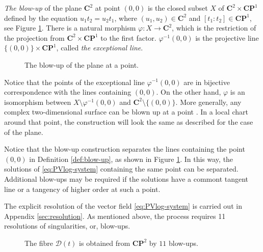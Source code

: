 \begin{definition}\label{def:blow-up}
\emph{The blow-up} of the plane $\mathbf{C}^2$ at point $(0,0)$ is the closed subset $X$ of $\mathbf{C}^2\times\mathbf{CP}^1$ defined by the equation $u_1t_2=u_2t_1$, where $(u_1,u_2)\in\mathbf{C}^2$ and $[t_1:t_2]\in\mathbf{CP}^1$, see Figure \ref{fig:blow-up}.
There is a natural morphism $\varphi: X\to\mathbf{C}^2$, which is the restriction of the projection from $\mathbf{C}^2\times\mathbf{CP}^1$ to the first factor.
$\varphi^{-1}(0,0)$ is the projective line $\{(0,0)\}\times\mathbf{CP}^1$, called \emph{the exceptional line}.
\end{definition}
\begin{figure}[h]
\centering

\caption{The blow-up of the plane at a point.}\label{fig:blow-up}
\end{figure}

\begin{remark}
Notice that the points of the exceptional line $\varphi^{-1}(0,0)$ are in bijective correspondence with the lines containing $(0,0)$.
On the other hand,
$\varphi$ is an isomorphism between $X\setminus\varphi^{-1}(0,0)$ and $\mathbf{C}^2\setminus\{(0,0)\}$.
More generally, any complex two-dimensional surface can be blown up at a point \cite{HartshorneAG,GrifHarPRINC,DuistermaatBOOK}.
In a local chart around that point, the construction will look the same as described for the case of the plane.
\end{remark}

Notice that the blow-up construction separates the lines containing the point $(0,0)$ in Definition \ref{def:blow-up}, as shown in Figure \ref{fig:blow-up}.
In this way, the solutions of \eqref{eq:PVlog-system} containing the same point can be separated.
Additional blow-ups may be required if the solutions have a commont tangent line or a tangency of higher order at such a point.

The explicit resolution of the vector field \eqref{eq:PVlog-system} is carried out in Appendix \ref{sec:resolution}. As mentioned above, the process requires 11 resolutions of singularities, or, blow-ups.

\begin{figure}[h]
\centering

\caption{The fibre $\mathcal{D}(t)$ is obtained from $\mathbf{CP}^2$ by $11$ blow-ups.}\label{fig:okamoto}
\end{figure}

